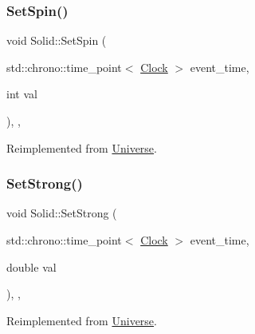 \mbox{\label{classSolid_a615cb8d1ec1376781726bcefa86339cb}} 
\subsubsection{\texorpdfstring{Set\+Spin()}{SetSpin()}}
{\footnotesize\ttfamily void Solid\+::\+Set\+Spin (\begin{DoxyParamCaption}\item[{std\+::chrono\+::time\+\_\+point$<$ \mbox{\hyperlink{universe_8h_a0ef8d951d1ca5ab3cfaf7ab4c7a6fd80}{Clock}} $>$}]{event\+\_\+time,  }\item[{int}]{val }\end{DoxyParamCaption})\hspace{0.3cm}{\ttfamily [inline]}, {\ttfamily [final]}, {\ttfamily [virtual]}}



Reimplemented from \mbox{\hyperlink{classUniverse_ae2ae1c3b3e4cde2c18f5f6a814761ec8}{Universe}}.

\mbox{\label{classSolid_a478e15cdf15c5bb01cbcbd5f584ef83a}} 
\subsubsection{\texorpdfstring{Set\+Strong()}{SetStrong()}}
{\footnotesize\ttfamily void Solid\+::\+Set\+Strong (\begin{DoxyParamCaption}\item[{std\+::chrono\+::time\+\_\+point$<$ \mbox{\hyperlink{universe_8h_a0ef8d951d1ca5ab3cfaf7ab4c7a6fd80}{Clock}} $>$}]{event\+\_\+time,  }\item[{double}]{val }\end{DoxyParamCaption})\hspace{0.3cm}{\ttfamily [inline]}, {\ttfamily [final]}, {\ttfamily [virtual]}}



Reimplemented from \mbox{\hyperlink{classUniverse_a5946c8f3d4cda305f3ecd10df21a2f94}{Universe}}.

\mbox{\label{classSolid_a4342786a7785b1a3816d20de02105bcf}} 
